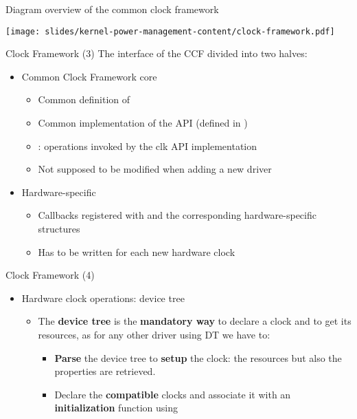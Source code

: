 \begin{frame}{Diagram overview of the common clock framework}
  \begin{center}
    \texttt{[image: slides/kernel-power-management-content/clock-framework.pdf]}
\end{center}
\end{frame}

\begin{frame}{Clock Framework (3)}
  The interface of the  CCF divided into two halves:
  \begin{itemize}
  \item Common Clock Framework core
    \begin{itemize}
    \item Common definition of 
    \item Common implementation of the  API (defined in
      )
    \item {}: operations invoked by the clk API
      implementation
    \item Not supposed to be modified when adding a new driver
    \end{itemize}
  \item Hardware-specific
    \begin{itemize}
    \item Callbacks registered with  and the
      corresponding hardware-specific structures
    \item Has to be written for each new hardware clock
    \end{itemize}
  \end{itemize}
\end{frame}

\begin{frame}{Clock Framework (4)}
  \begin{itemize}
  \item Hardware clock operations: device tree
    \begin{itemize}
    \item The \textbf{device tree} is the \textbf{mandatory way} to
      declare a clock and to get its resources, as for any other
      driver using DT we have to:
      \begin{itemize}
      \item \textbf{Parse} the device tree to \textbf{setup} the
        clock: the resources but also the properties are retrieved.
      \item Declare the \textbf{compatible} clocks and associate it
        with an \textbf{initialization} function using
      \end{itemize}
    \end{itemize}
  \end{itemize}
\end{frame}

